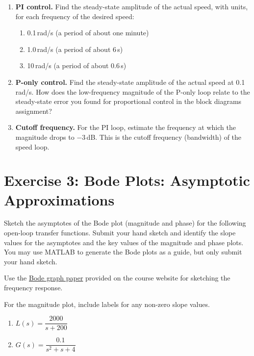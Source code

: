 \documentclass[11pt]{article}
\begin{document}
\begin{enumerate}
\item \textbf{PI control.}  Find the steady-state amplitude of the actual speed, with units, for each frequency of the desired speed:
  \begin{enumerate}
  \item 0.1\,rad/s (a period of about one minute)
  \item 1.0\,rad/s (a period of about 6\,s)
  \item 10\,rad/s (a period of about 0.6\,s)
  \end{enumerate}

\item \textbf{P-only control.}  Find the steady-state amplitude of the actual speed at 0.1\,rad/s.  How does the low-frequency magnitude of the P-only loop relate to the steady-state error you found for proportional control in the block diagrams assignment?

\item \textbf{Cutoff frequency.}  For the PI loop, estimate the frequency at which the magnitude drops to $-3$\,dB.  This is the cutoff frequency (bandwidth) of the speed loop.

\end{enumerate}

\section*{Exercise 3: Bode Plots: Asymptotic Approximations}

Sketch the asymptotes of the Bode plot (magnitude and phase) for the following open-loop transfer functions.  Submit your hand sketch and identify the slope values for the asymptotes and the key values of the magnitude and phase plots.  You may use MATLAB to generate the Bode plots as a guide, but only submit your hand sketch.

Use the \href{https://bsb808.github.io/me2801/handouts/bode2_nolabel.png}{Bode graph paper} provided on the course website for sketching the frequency response.

For the magnitude plot, include labels for any non-zero slope values.

\begin{enumerate}
\item $L(s) = \dfrac{2000}{s + 200}$
\item $G(s) = \dfrac{0.1}{s^2 + s + 4}$
\end{enumerate}

\end{document}
